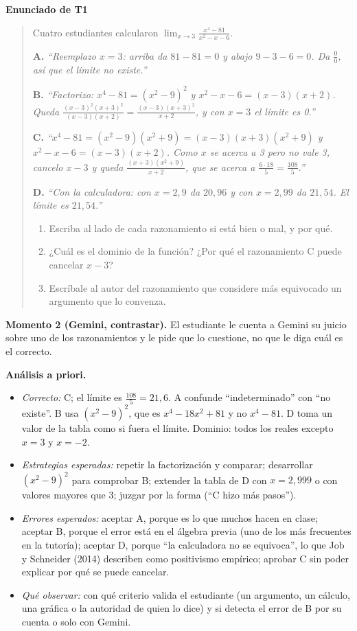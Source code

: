 \documentclass[11pt,letterpaper]{article}
\newenvironment{tarea}[1]{\par\medskip\noindent\textbf{Enunciado de #1}\begin{quote}}{\end{quote}}
\begin{document}
\begin{tarea}{T1}
Cuatro estudiantes calcularon $\displaystyle\lim_{x\to 3}\frac{x^4-81}{x^2-x-6}$.

\textbf{A.} \emph{``Reemplazo $x=3$: arriba da $81-81=0$ y abajo $9-3-6=0$. Da $\frac{0}{0}$, así que el límite no existe.''}

\textbf{B.} \emph{``Factorizo: $x^4-81=(x^2-9)^2$ y $x^2-x-6=(x-3)(x+2)$. Queda $\frac{(x-3)^2(x+3)^2}{(x-3)(x+2)}=\frac{(x-3)(x+3)^2}{x+2}$, y con $x=3$ el límite es 0.''}

\textbf{C.} \emph{``$x^4-81=(x^2-9)(x^2+9)=(x-3)(x+3)(x^2+9)$ y $x^2-x-6=(x-3)(x+2)$. Como $x$ se acerca a 3 pero no vale 3, cancelo $x-3$ y queda $\frac{(x+3)(x^2+9)}{x+2}$, que se acerca a $\frac{6\cdot18}{5}=\frac{108}{5}$.''}

\textbf{D.} \emph{``Con la calculadora: con $x=2{,}9$ da $20{,}96$ y con $x=2{,}99$ da $21{,}54$. El límite es $21{,}54$.''}

\begin{enumerate}[label=\alph*)]
  \item Escriba al lado de cada razonamiento si está bien o mal, y por qué.
  \item ¿Cuál es el dominio de la función? ¿Por qué el razonamiento C puede cancelar $x-3$?
  \item Escríbale al autor del razonamiento que considere más equivocado un argumento que lo convenza.
\end{enumerate}
\end{tarea}

\textbf{Momento 2 (Gemini, contrastar).} El estudiante le cuenta a Gemini su juicio sobre uno de los razonamientos y le pide que lo cuestione, no que le diga cuál es el correcto.

\textbf{Análisis a priori.}
\begin{itemize}
  \item \emph{Correcto:} C; el límite es $\frac{108}{5}=21{,}6$. A confunde ``indeterminado'' con ``no existe''. B usa $(x^2-9)^2$, que es $x^4-18x^2+81$ y no $x^4-81$. D toma un valor de la tabla como si fuera el límite. Dominio: todos los reales excepto $x=3$ y $x=-2$.
  \item \emph{Estrategias esperadas:} repetir la factorización y comparar; desarrollar $(x^2-9)^2$ para comprobar B; extender la tabla de D con $x=2{,}999$ o con valores mayores que 3; juzgar por la forma (``C hizo más pasos'').
  \item \emph{Errores esperados:} aceptar A, porque es lo que muchos hacen en clase; aceptar B, porque el error está en el álgebra previa (uno de los más frecuentes en la tutoría); aceptar D, porque ``la calculadora no se equivoca'', lo que Job y Schneider (2014) describen como positivismo empírico; aprobar C sin poder explicar por qué se puede cancelar.
  \item \emph{Qué observar:} con qué criterio valida el estudiante (un argumento, un cálculo, una gráfica o la autoridad de quien lo dice) y si detecta el error de B por su cuenta o solo con Gemini.
\end{itemize}
\end{document}
